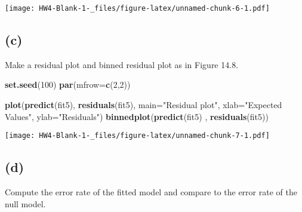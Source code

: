 \documentclass[
]{article}
\newenvironment{Shaded}{\begin{snugshade}}{\end{snugshade}}
\newcommand{\CommentTok}[1]{\textcolor[rgb]{0.56,0.35,0.01}{\textit{#1}}}
\newcommand{\ControlFlowTok}[1]{\textcolor[rgb]{0.13,0.29,0.53}{\textbf{#1}}}
\newcommand{\DataTypeTok}[1]{\textcolor[rgb]{0.13,0.29,0.53}{#1}}
\newcommand{\DecValTok}[1]{\textcolor[rgb]{0.00,0.00,0.81}{#1}}
\newcommand{\FloatTok}[1]{\textcolor[rgb]{0.00,0.00,0.81}{#1}}
\newcommand{\KeywordTok}[1]{\textcolor[rgb]{0.13,0.29,0.53}{\textbf{#1}}}
\newcommand{\NormalTok}[1]{#1}
\newcommand{\OperatorTok}[1]{\textcolor[rgb]{0.81,0.36,0.00}{\textbf{#1}}}
\newcommand{\StringTok}[1]{\textcolor[rgb]{0.31,0.60,0.02}{#1}}
\begin{document}
\texttt{[image: HW4-Blank-1-\_files/figure-latex/unnamed-chunk-6-1.pdf]}

\hypertarget{c}{%
\subsection{(c)}\label{c}}

Make a residual plot and binned residual plot as in Figure 14.8.

\begin{Shaded}
\begin{Highlighting}[]
\KeywordTok{set.seed}\NormalTok{(}\DecValTok{100}\NormalTok{)}
\KeywordTok{par}\NormalTok{(}\DataTypeTok{mfrow=}\KeywordTok{c}\NormalTok{(}\DecValTok{2}\NormalTok{,}\DecValTok{2}\NormalTok{))}

\KeywordTok{plot}\NormalTok{(}\KeywordTok{predict}\NormalTok{(fit5), }\KeywordTok{residuals}\NormalTok{(fit5), }\DataTypeTok{main=}\StringTok{"Residual plot"}\NormalTok{, }\DataTypeTok{xlab=}\StringTok{"Expected Values"}\NormalTok{, }\DataTypeTok{ylab=}\StringTok{"Residuals"}\NormalTok{)}
\KeywordTok{binnedplot}\NormalTok{(}\KeywordTok{predict}\NormalTok{(fit5) , }\KeywordTok{residuals}\NormalTok{(fit5))}
\end{Highlighting}
\end{Shaded}

\texttt{[image: HW4-Blank-1-\_files/figure-latex/unnamed-chunk-7-1.pdf]}

\hypertarget{d}{%
\subsection{(d)}\label{d}}

Compute the error rate of the fitted model and compare to the error rate
of the null model.

\begin{Shaded}
\end{Shaded}
\end{document}

